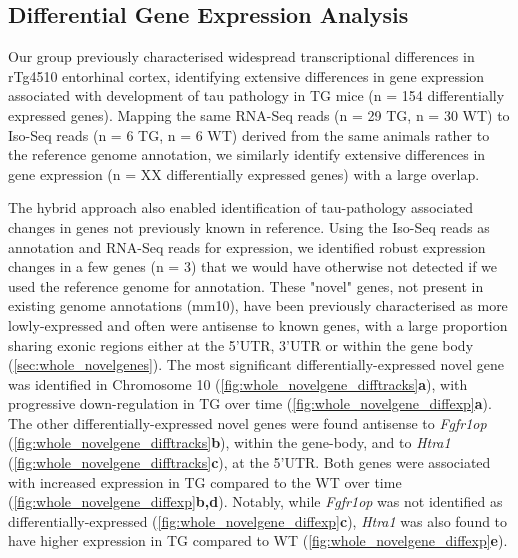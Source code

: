 \subsection{Differential Gene Expression Analysis}
Our group previously characterised widespread transcriptional differences in rTg4510 entorhinal cortex, identifying extensive differences in gene expression associated with development of tau pathology in TG mice (n = 154 differentially expressed genes)\cite{Castanho2020}. Mapping the same RNA-Seq reads (n = 29 TG, n = 30 WT) to Iso-Seq reads (n = 6 TG, n = 6 WT) derived from the same animals rather to the reference genome annotation, we similarly identify extensive differences in gene expression (n = XX differentially expressed genes) with a large overlap. 

The hybrid approach also enabled identification of tau-pathology associated changes in genes not previously known in reference. Using the Iso-Seq reads as annotation and RNA-Seq reads for expression, we identified robust expression changes in a few genes (n = 3) that we would have otherwise not detected if we used the reference genome for annotation. These "novel" genes, not present in existing genome annotations (mm10), have been previously characterised as more lowly-expressed and often were antisense to known genes, with a large proportion sharing exonic regions either at the 5'UTR, 3'UTR or within the gene body (\cref{sec:whole_novelgenes}). The most significant differentially-expressed novel gene was identified in Chromosome 10 (\cref{fig:whole_novelgene_difftracks}\textbf{a}), with progressive down-regulation in TG over time (\cref{fig:whole_novelgene_diffexp}\textbf{a}). The other differentially-expressed novel genes were found antisense to \textit{Fgfr1op} (\cref{fig:whole_novelgene_difftracks}\textbf{b}), within the gene-body, and to \textit{Htra1}  (\cref{fig:whole_novelgene_difftracks}\textbf{c}), at the 5'UTR. Both genes were associated with increased expression in TG compared to the WT over time (\cref{fig:whole_novelgene_diffexp}\textbf{b,d}). Notably, while \textit{Fgfr1op} was not identified as differentially-expressed (\cref{fig:whole_novelgene_diffexp}\textbf{c}), \textit{Htra1} was also found to have higher expression in TG compared to WT (\cref{fig:whole_novelgene_diffexp}\textbf{e}).     

